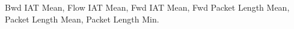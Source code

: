Bwd IAT Mean, Flow IAT Mean, Fwd IAT Mean, Fwd Packet Length Mean, Packet Length Mean, Packet Length Min.